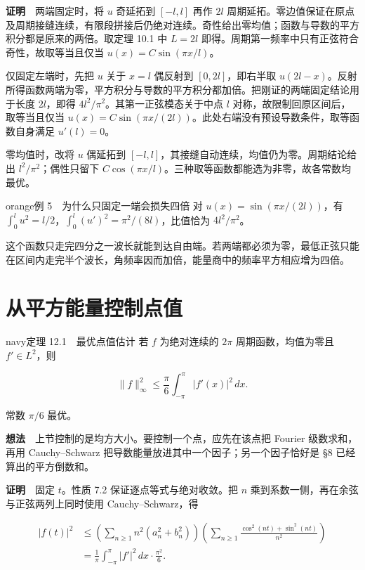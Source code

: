 \documentclass[12pt,a4paper]{article}
\newcommand{\mysection}[1]{\clearpage\section{#1}}
\begin{document}
\textbf{证明}　两端固定时，将 \(u\) 奇延拓到 \([-l,l]\) 再作 \(2l\) 周期延拓。零边值保证在原点及周期接缝连续，有限段拼接后仍绝对连续。奇性给出零均值；函数与导数的平方积分都是原来的两倍。取定理 10.1 中 \(L=2l\) 即得。周期第一频率中只有正弦符合奇性，故取等当且仅当 \(u(x)=C\sin(\pi x/l)\)。

仅固定左端时，先把 \(u\) 关于 \(x=l\) 偶反射到 \([0,2l]\)，即右半取 \(u(2l-x)\)。反射所得函数两端为零，平方积分与导数的平方积分都加倍。把刚证的两端固定结论用于长度 \(2l\)，即得 \(4l^2/\pi^2\)。其第一正弦模态关于中点 \(l\) 对称，故限制回原区间后，取等当且仅当 \(u(x)=C\sin(\pi x/(2l))\)。此处右端没有预设导数条件，取等函数自身满足 \(u'(l)=0\)。

零均值时，改将 \(u\) 偶延拓到 \([-l,l]\)，其接缝自动连续，均值仍为零。周期结论给出 \(l^2/\pi^2\)；偶性只留下 \(C\cos(\pi x/l)\)。三种取等函数都能选为非零，故各常数均最优。

\begin{sboxenv}{orange}{例 5　为什么只固定一端会损失四倍}
对 \(u(x)=\sin(\pi x/(2l))\)，有 \(\int_0^l u^2=l/2\)，\(\int_0^l (u')^2=\pi^2/(8l)\)，比值恰为 \(4l^2/\pi^2\)。
\end{sboxenv}

这个函数只走完四分之一波长就能到达自由端。若两端都必须为零，最低正弦只能在区间内走完半个波长，角频率因而加倍，能量商中的频率平方相应增为四倍。

\mysection{从平方能量控制点值}




\begin{sboxenv}{navy}{定理 12.1　最优点值估计}
若 \(f\) 为绝对连续的 \(2\pi\) 周期函数，均值为零且 \(f'\in L^2\)，则

\[
\|f\|_\infty^2\le\frac{\pi}{6}\int_{-\pi}^{\pi}|f'(x)|^2\,dx .
\]

常数 \(\pi/6\) 最优。
\end{sboxenv}

\textbf{想法}　上节控制的是均方大小。要控制一个点，应先在该点把 Fourier 级数求和，再用 Cauchy--Schwarz 把导数能量放进其中一个因子；另一个因子恰好是 §8 已经算出的平方倒数和。

\textbf{证明}　固定 \(t\)。性质 7.2 保证逐点等式与绝对收敛。把 \(n\) 乘到系数一侧，再在余弦与正弦两列上同时使用 Cauchy--Schwarz，得

\[
 \begin{aligned}
 |f(t)|^2
 &\le \left(\sum_{n\ge1}n^2(a_n^2+b_n^2)\right)
 \left(\sum_{n\ge1}\frac{\cos^2(nt)+\sin^2(nt)}{n^2}\right)\\
 &=\frac1\pi\int_{-\pi}^{\pi}|f'|^2\,dx\cdot\frac{\pi^2}{6}.
 \end{aligned}
\]
\end{document}
